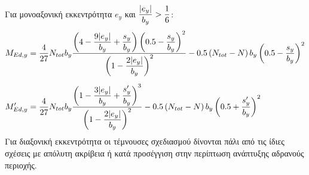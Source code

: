 Για μονοαξονική εκκεντρότητα $e_y$ και $\dfrac{\lvert e_y\rvert}{b_y} > \dfrac{1}{6}$:
\begin{subequations}
\begin{align}
  M_{Ed,y} & = \dfrac{4}{27}N_{tot}b_y\dfrac{\left(4 - \dfrac{9\lvert e_y\rvert}{b_y} + \dfrac{s_y}{b_y}\right)\left(0.5 - \dfrac{s_y}{b_y}\right)^2}{\left(1-\dfrac{2\lvert e_y\rvert}{b_y}\right)^2} - 0.5\left(N_{tot} - N\right)b_y\left(0.5 - \dfrac{s_y}{b_y}\right)^2 \label{eqn:225a}\\[5pt]
  M'_{Ed,y} & = \dfrac{4}{27}N_{tot}b_y\dfrac{\left(1 - \dfrac{3\lvert e_y\rvert}{b_y} + \dfrac{s'_y}{b_y}\right)^3}{\left(1-\dfrac{2\lvert e_y\rvert}{b_y}\right)^2} - 0.5\left(N_{tot} - N\right)b_y\left(0.5 + \dfrac{s'_y}{b_y}\right)^2 \label{eqn:225b}
\end{align}
\end{subequations}
Για διαξονική εκκεντρότητα οι τέμνουσες σχεδιασμού δίνονται πάλι από τις ίδιες σχέσεις με απόλυτη ακρίβεια ή κατά προσέγγιση στην περίπτωση ανάπτυξης αδρανούς περιοχής.